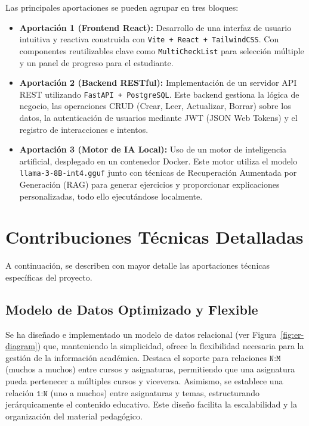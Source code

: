 Las principales aportaciones se pueden agrupar en tres bloques:
\begin{itemize}
    \item \textbf{Aportación 1 (Frontend React):} Desarrollo de una interfaz de usuario intuitiva y reactiva construida con \texttt{Vite + React + TailwindCSS}. Con componentes reutilizables clave como \texttt{MultiCheckList} para selección múltiple y un panel de progreso para el estudiante.
    \item \textbf{Aportación 2 (Backend RESTful):} Implementación de un servidor API REST utilizando \texttt{FastAPI + PostgreSQL}. Este backend gestiona la lógica de negocio, las operaciones CRUD (Crear, Leer, Actualizar, Borrar) sobre los datos, la autenticación de usuarios mediante JWT (JSON Web Tokens) y el registro de interacciones e intentos.
    \item \textbf{Aportación 3 (Motor de IA Local):} Uso de un motor de inteligencia artificial, desplegado en un contenedor Docker. Este motor utiliza el modelo \texttt{llama-3-8B-int4.gguf} junto con técnicas de Recuperación Aumentada por Generación (RAG) para generar ejercicios y proporcionar explicaciones personalizadas, todo ello ejecutándose localmente.
\end{itemize}

\section{Contribuciones Técnicas Detalladas}
\label{sec:contribuciones_tecnicas}

A continuación, se describen con mayor detalle las aportaciones técnicas específicas del proyecto.

\subsection{Modelo de Datos Optimizado y Flexible}
\label{ssec:datamodel_aportaciones}

Se ha diseñado e implementado un modelo de datos relacional (ver Figura~\ref{fig:er-diagram}) que, manteniendo la simplicidad, ofrece la flexibilidad necesaria para la gestión de la información académica. Destaca el soporte para relaciones \(\texttt{N:M}\) (muchos a muchos) entre cursos y asignaturas, permitiendo que una asignatura pueda pertenecer a múltiples cursos y viceversa. Asimismo, se establece una relación \(\texttt{1:N}\) (uno a muchos) entre asignaturas y temas, estructurando jerárquicamente el contenido educativo. Este diseño facilita la escalabilidad y la organización del material pedagógico.

